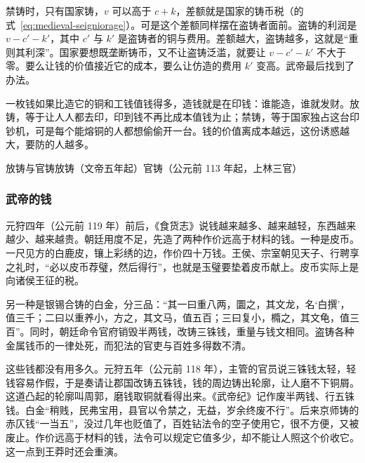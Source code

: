 禁铸时，只有国家铸，$v$ 可以高于 $c+k$，差额就是国家的铸币税（的式~\eqref{eq:medieval-seigniorage}）。可是这个差额同样摆在盗铸者面前。盗铸的利润是 $v-c'-k'$，其中 $c'$ 与 $k'$ 是盗铸者的铜与费用。差额越大，盗铸越多，这就是“重则其利深”。国家要想既垄断铸币，又不让盗铸泛滥，就要让 $v-c'-k'$ 不大于零。要么让钱的价值接近它的成本，要么让仿造的费用 $k'$ 变高。武帝最后找到了办法。

\begin{intuition}
一枚钱如果比造它的铜和工钱值钱得多，造钱就是在印钱：谁能造，谁就发财。放铸，等于让人人都去印，印到钱不再比成本值钱为止；禁铸，等于国家独占这台印钞机，可是每个能熔铜的人都想偷偷开一台。钱的价值离成本越远，这份诱惑越大，要防的人越多。
\end{intuition}

\begin{compare}{放铸与官铸}{放铸（文帝五年起）}{官铸（公元前 113 年起，上林三官）}
\end{compare}

\subsubsection{武帝的钱}
元狩四年（公元前 119 年）前后，《食货志》说钱越来越多、越来越轻，东西越来越少、越来越贵\cite{hanshu}。朝廷用度不足，先造了两种作价远高于材料的钱。一种是皮币。一尺见方的白鹿皮，镶上彩绣的边，作价四十万钱。王侯、宗室朝见天子、行聘享之礼时，“必以皮币荐璧，然后得行”\cite{hanshu}，也就是玉璧要垫着皮币献上。皮币实际上是向诸侯王征的税。

另一种是银锡合铸的白金，分三品：“其一曰重八两，圜之，其文龙，名‘白撰’，值三千；二曰以重养小，方之，其文马，值五百；三曰复小，橢之，其文龟，值三百”\cite{hanshu}。同时，朝廷命令官府销毁半两钱，改铸三铢钱，重量与钱文相同。盗铸各种金属钱币的一律处死，而犯法的官吏与百姓多得数不清\cite{hanshu}。

这些钱都没有用多久。元狩五年（公元前 118 年），主管的官员说三铢钱太轻，轻钱容易作假，于是奏请让郡国改铸五铢钱，钱的周边铸出轮廓，让人磨不下铜屑\cite{hanshu}。这道凸起的轮廓叫周郭，磨钱取铜就看得出来。《武帝纪》记作废半两钱、行五铢钱\cite{hanshu}。白金“稍贱，民弗宝用，县官以令禁之，无益，岁余终废不行”\cite{hanshu}。后来京师铸的赤仄钱“一当五”，没过几年也贬值了，百姓钻法令的空子使用它，很不方便，又被废止\cite{hanshu}。作价远高于材料的钱，法令可以规定它值多少，却不能让人照这个价收它。这一点到王莽时还会重演。

